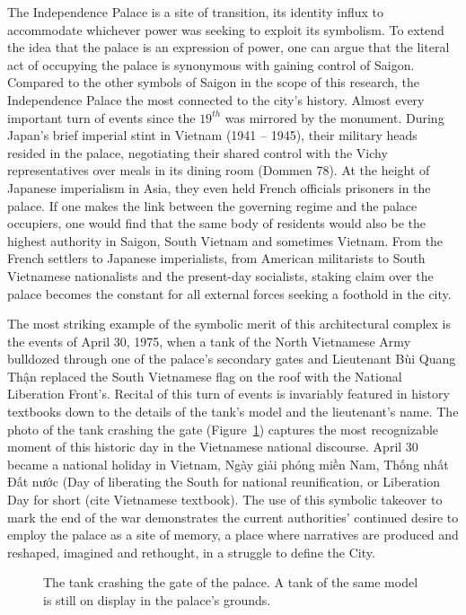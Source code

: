 \vi The Independence Palace is a site of transition, its identity influx to accommodate whichever power was seeking to exploit its symbolism. To extend the idea that the palace is an expression of power, one can argue that the literal act of occupying the palace is synonymous with gaining control of Saigon. Compared to the other symbols of Saigon in the scope of this research, the Independence Palace the most connected to the city’s history. Almost every important turn of events since the $19^{th}$ was mirrored by the monument. During Japan’s brief imperial stint in Vietnam (1941 – 1945), their military heads resided in the palace, negotiating their shared control with the Vichy representatives over meals in its dining room (Dommen 78). At the height of Japanese imperialism in Asia, they even held French officials prisoners in the palace. If one makes the link between the governing regime and the palace occupiers, one would find that the same body of residents would also be the highest authority in Saigon, South Vietnam and sometimes Vietnam. From the French settlers to Japanese imperialists, from American militarists to South Vietnamese nationalists and the present-day socialists, staking claim over the palace becomes the constant for all external forces seeking a foothold in the city.

The most striking example of the symbolic merit of this architectural complex is the events of April 30, 1975, when a tank of the North Vietnamese Army bulldozed through one of the palace’s secondary gates and Lieutenant Bùi Quang Thận replaced the South Vietnamese flag on the roof with the National Liberation Front’s. Recital of this turn of events is invariably featured in history textbooks down to the details of the tank’s model and the lieutenant’s name. The photo of the tank crashing the gate (Figure~\ref{tank}) captures the most recognizable moment of this historic day in the Vietnamese national discourse. April 30  became a national holiday in Vietnam, Ngày giải phóng miền Nam, Thống nhất Đất nước (Day of liberating the South for national reunification, or Liberation Day for short (cite Vietnamese textbook). The use of this symbolic takeover to mark the end of the war demonstrates the current authorities’ continued desire to employ the palace as a site of memory, a place where narratives are produced and reshaped, imagined and rethought, in a struggle to define the City. \en

\begin{figure}[!ht]
\begin{center}
\vspace{-.2 in}
\caption{\vi The tank crashing the gate of the palace. A tank of the same model is still on display in the palace's grounds.}\label{tank}
\end{center}
\vspace{-.2 in}
\end{figure}

